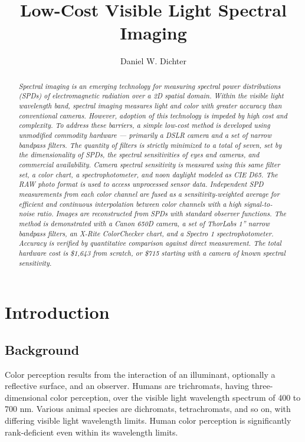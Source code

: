 \documentclass[twocolumn,10pt]{asme2ej}
\title{Low-Cost Visible Light Spectral Imaging}
\author{Daniel W. Dichter
    \affiliation{
Independent Researcher\\
Cambridge, Massachusetts, U.S.A.\\
daniel.w.dichter@gmail.com\\
\\
\color{red}
\emph{\textbf{DRAFT: \today}}\\
\color{black}

    }	
}
\begin{document}
\maketitle

\pagestyle{fancy}

\begin{abstract}{\it Spectral imaging is an emerging technology for measuring spectral power distributions (SPDs) of electromagnetic radiation over a 2D spatial domain. Within the visible light wavelength band, spectral imaging measures light and color with greater accuracy than conventional cameras. However, adoption of this technology is impeded by high cost and complexity. To address these barriers, a simple low-cost method is developed using unmodified commodity hardware --- primarily a DSLR camera and a set of narrow bandpass filters. The quantity of filters is strictly minimized to a total of seven, set by the dimensionality of SPDs, the spectral sensitivities of eyes and cameras, and commercial availability. Camera spectral sensitivity is measured using this same filter set, a color chart, a spectrophotometer, and noon daylight modeled as CIE D65. The RAW photo format is used to access unprocessed sensor data. Independent SPD measurements from each color channel are fused as a sensitivity-weighted average for efficient and continuous interpolation between color channels with a high signal-to-noise ratio. Images are reconstructed from SPDs with standard observer functions. The method is demonstrated with a Canon 650D camera, a set of ThorLabs 1'' narrow bandpass filters, an X-Rite ColorChecker chart, and a Spectro 1 spectrophotometer. Accuracy is verified by quantitative comparison against direct measurement. The total hardware cost is \$1,643 from scratch, or \$715 starting with a camera of known spectral sensitivity.
}
\end{abstract}

\section{Introduction}

\subsection{Background}


Color perception results from the interaction of an illuminant, optionally a reflective surface, and an observer. Humans are trichromats, having three-dimensional color perception, over the visible light wavelength spectrum of 400 to 700 nm. Various animal species are dichromats, tetrachromats, and so on, with differing visible light wavelength limits. Human color perception is significantly rank-deficient even within its wavelength limits.
\end{document}
